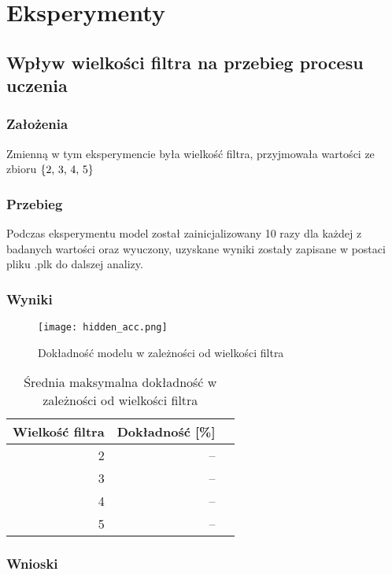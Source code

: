 \documentclass{article}
\begin{document}
\newpage
\section{Eksperymenty}

\subsection{Wpływ wielkości filtra na przebieg procesu uczenia}
\subsubsection*{Założenia}

Zmienną w tym eksperymencie była wielkość filtra, przyjmowała wartości ze zbioru \(\{$2, 3, 4, 5$\}\)
\subsubsection*{Przebieg}

Podczas eksperymentu model został zainicjalizowany 10 razy dla każdej z badanych wartości oraz wyuczony, uzyskane wyniki zostały zapisane w postaci pliku .plk do dalszej analizy.

\subsubsection*{Wyniki}
\begin{figure}[H]
	\centering
	\caption{Dokładność modelu w zależności od wielkości filtra}
	\texttt{[image: hidden\_acc.png]}
	\label{fig:res11}
\end{figure}

\begin{table}[H]
	\caption{Średnia maksymalna dokładność w zależności od wielkości filtra}
	\label{tabela-res-11}
	\centering
	\begin{tabular}{rrr}
		\toprule
		Wielkość filtra & Dokładność [\%] \\
		\midrule
		2                 & --                 \\
		3                 & --                 \\
		4                 & --                 \\
		5                 & --                 \\
		\bottomrule
	\end{tabular}
\end{table}

\subsubsection*{Wnioski}
\end{document}
